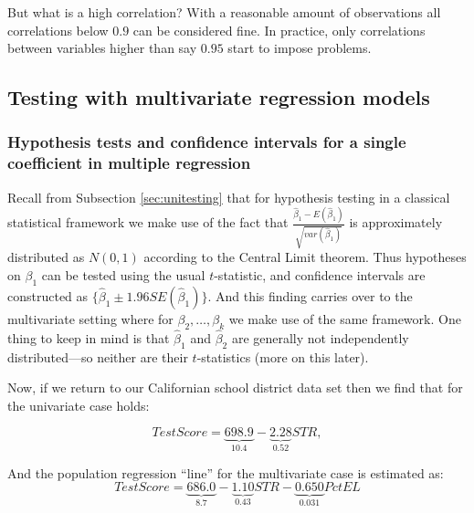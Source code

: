 \documentclass[
]{book}
\begin{document}
But what is a high correlation? With a reasonable amount of observations all correlations below \(0.9\) can be considered fine. In practice, only correlations between variables higher than say \(0.95\) start to impose problems.

\hypertarget{testing-with-multivariate-regression-models}{%
\subsection{Testing with multivariate regression models}\label{testing-with-multivariate-regression-models}}

\hypertarget{hypothesis-tests-and-confidence-intervals-for-a-single-coefficient-in-multiple-regression}{%
\subsubsection{Hypothesis tests and confidence intervals for a single coefficient in multiple regression}\label{hypothesis-tests-and-confidence-intervals-for-a-single-coefficient-in-multiple-regression}}

Recall from Subsection \ref{sec:unitesting} that for hypothesis testing in a classical statistical framework we make use of the fact that \(\frac{\hat{\beta}_1- E(\hat{\beta}_1)}{\sqrt{var(\hat{\beta}_1)}}\) is approximately distributed as \(N(0,1)\) according to the Central Limit theorem. Thus hypotheses on \(\beta_1\) can be tested using the usual \(t\)-statistic, and confidence intervals are constructed as \(\{\hat{\beta}_1 \pm 1.96 SE (\hat{\beta}_1)\}\). And this finding carries over to the multivariate setting where for \(\beta_2,\ldots, \beta_k\) we make use of the same framework. One thing to keep in mind is that \(\hat{\beta}_1\) and \(\hat{\beta}_2\) are generally not independently distributed---so neither are their \(t\)-statistics (more on this later).

Now, if we return to our Californian school district data set then we find that for the univariate case holds:

\begin{equation}
TestScore =\underbrace{698.9}_{10.4} - \underbrace{2.28}_{0.52}  STR, 
\end{equation}

And the population regression ``line'' for the multivariate case is estimated as:
\begin{equation}
TestScore = \underbrace{686.0}_{8.7} - \underbrace{1.10}_{0.43} STR - \underbrace{0.650}_{0.031} PctEL
    \label{eq:testmulti}
\end{equation}
\end{document}

